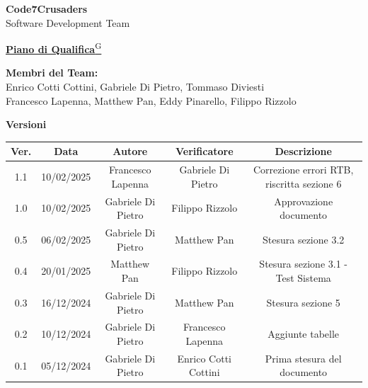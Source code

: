 \documentclass{article}
\begin{document}
\begin{titlepage}
    {\Huge \textbf{Code7Crusaders}}\\
    \vspace{0.5cm}
    {\Large Software Development Team}\\
    \vspace{2cm}
    
    {\large \href{https://code7crusaders.github.io/docs/RTB/documentazione_interna/glossario.html#piano-di-progetto}{\textbf{Piano di Qualifica}\textsuperscript{G}}}\\
    \vspace{5cm}
    
    
    \textbf{Membri del Team:}\\
    Enrico Cotti Cottini, Gabriele Di Pietro, Tommaso Diviesti \\
    Francesco Lapenna, Matthew Pan, Eddy Pinarello, Filippo Rizzolo \\
    \vspace{0.5cm}
    
    \vspace{1cm}
\end{titlepage}



\begin{table}[h!]
\centering
\textbf{Versioni} \\ %
\vspace{2mm} %
\begin{tabular}{|c|c|c|c|c|}
    \hline
    \textbf{Ver.} & \textbf{Data} & \textbf{Autore} & \textbf{Verificatore} & \textbf{Descrizione} \\
    \hline
    1.1 & 10/02/2025 & Francesco Lapenna & Gabriele Di Pietro & Correzione errori RTB, riscritta sezione 6 \\
    1.0 & 10/02/2025 & Gabriele Di Pietro & Filippo Rizzolo & Approvazione documento \\
    0.5 & 06/02/2025 & Gabriele Di Pietro & Matthew Pan & Stesura sezione 3.2 \\
    0.4 & 20/01/2025 & Matthew Pan & Filippo Rizzolo & Stesura sezione 3.1 - Test Sistema \\
    0.3 & 16/12/2024 & Gabriele Di Pietro & Matthew Pan & Stesura sezione 5 \\
    0.2 & 10/12/2024 & Gabriele Di Pietro & Francesco Lapenna & Aggiunte tabelle \\
    0.1 & 05/12/2024 & Gabriele Di Pietro & Enrico Cotti Cottini & Prima stesura del documento \\  
    \hline
\end{tabular}
\label{tab:versioni}
\end{table}
\newpage
\end{document}
